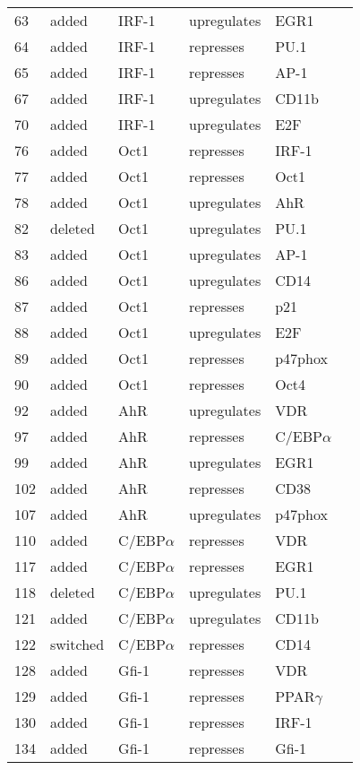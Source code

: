 \begin{center}
\begin{scriptsize}
\begin{supertabular}{|p{2 cm}|p{2cm}|p{3cm}|p{2.5cm}|p{2cm}|p{1.5cm}|}
63 &  added & IRF-1  & upregulates &  EGR1 & \\
64 &  added & IRF-1  & represses &  PU.1 & \\
65 &  added & IRF-1  & represses &  AP-1 & \\
67 &  added & IRF-1  & upregulates &  CD11b & \\
70 &  added & IRF-1  & upregulates &  E2F & \\
76 &  added & Oct1  & represses &  IRF-1 & \\
77 &  added & Oct1  & represses &  Oct1 & \\
78 &  added & Oct1  & upregulates &  AhR & \\
82 &  deleted & Oct1  & upregulates &  PU.1 & \\
83 &  added & Oct1  & upregulates &  AP-1 & \cite{Ullman1993} \\
86 &  added & Oct1  & upregulates &  CD14 & \\
87 &  added & Oct1  & represses &  p21 & \\
88 &  added & Oct1  & upregulates &  E2F & \\
89 &  added & Oct1  & represses &  p47phox & \\
90 &  added & Oct1  & represses &  Oct4 & \\
92 &  added & AhR  & upregulates &  VDR & \\
97 &  added & AhR  & represses &  C/EBP$\alpha$ & \\
99 &  added & AhR  & upregulates &  EGR1 & \cite{Martinez2004} \\
102 &  added & AhR  & represses &  CD38 & \\
107 &  added & AhR  & upregulates &  p47phox & \\
110 &  added & C/EBP$\alpha$  & represses &  VDR & \\
117 &  added & C/EBP$\alpha$  & represses &  EGR1 & \cite{Hasemann2014}\\
118 &  deleted & C/EBP$\alpha$  & upregulates &  PU.1 & \\
121 &  added & C/EBP$\alpha$  & upregulates &  CD11b & \\
122 &  switched &  C/EBP$\alpha$  & represses &  CD14 & \\
128 &  added & Gfi-1  & represses &  VDR & \\
129 &  added & Gfi-1  & represses &  PPAR$\gamma$ & \\
130 &  added & Gfi-1  & represses &  IRF-1 & \\
134 &  added & Gfi-1  & represses &  Gfi-1 & \cite{Doan2004}\\

\end{supertabular}
\end{scriptsize}
\end{center}
